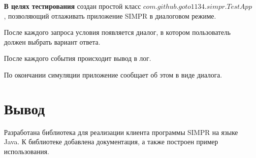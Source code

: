  		
 		\textbf{В целях тестирования} создан простой класс $ com.github.goto1134.simpr.TestApp $, позволяющий отлаживать приложение SIMPR в диалоговом режиме. 
 		
 		После каждого запроса условия появляется диалог, в котором пользователь должен выбрать вариант ответа.
 		
 		После каждого события происходит вывод в лог.
 		
 		По окончании симуляции приложение сообщает об этом в виде диалога.
			
	\section{Вывод}
		Разработана библиотека для реализации клиента программы SIMPR на языке Java. 
		К библиотеке добавлена документация, а также построен пример использования.